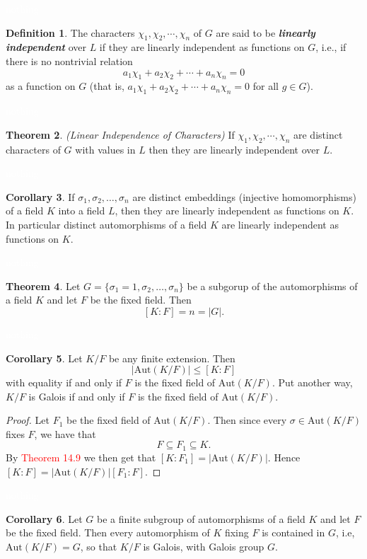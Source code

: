 \documentclass{article}
\theoremstyle{definition}
\newtheorem{thm}{Theorem}[section]
\newtheorem{cor}[thm]{Corollary}
\newtheorem{defn}[thm]{Definition}
\newcommand{\nl}{\textcolor{white}{nothing}}
\newcommand{\seq}{\subseteq}
\newcommand{\sig}{\sigma}
\newcommand{\Aut}{\text{Aut}}
\begin{document}
\nl

\begin{defn}
The characters $\chi_1, \chi_2, \cdots, \chi_n$ of $G$ are said to be \textit{\textbf{linearly independent}} over $L$ if they are linearly independent as functions on $G$, i.e., if there is no nontrivial relation
\[a_1\chi_1 + a_2\chi_2 + \cdots + a_n\chi_n = 0\]
as a function on $G$ (that is, $a_1\chi_1 + a_2\chi_2 + \cdots + a_n\chi_n = 0$ for all $g\in G$).
\end{defn}

\nl

\begin{thm}\textit{(Linear Independence of Characters)}
If $\chi_1, \chi_2, \cdots, \chi_n$ are distinct characters of $G$ with values in $L$ then they are linearly independent over $L$.
\end{thm}

\nl

\begin{cor}
If $\sig_1, \sig_2, \ldots, \sig_n$ are distinct embeddings (injective homomorphisms) of a field $K$ into a field $L$, then they are linearly independent as functions on $K$. In particular distinct automorphisms of a field $K$ are linearly independent as functions on $K$.
\end{cor}

\nl

\begin{thm}
Let $G = \{\sig_1 = 1, \sig_2, \ldots, \sig_n\}$ be a subgorup of the automorphisms of a field $K$ and let $F$ be the fixed field. Then
\[[K:F] = n = |G|.\]
\end{thm}

\nl

\begin{cor}
Let $K/F$ be any finite extension. Then
\[|\Aut(K/F)|\leq [K:F]\]
with equality if and only if $F$ is the fixed field of $\Aut(K/F)$. Put another way, $K/F$ is Galois if and only if $F$ is the fixed field of $\Aut(K/F)$.
\end{cor}

\begin{proof}
Let $F_1$ be the fixed field of $\Aut(K/F)$. Then since every $\sigma \in \Aut(K/F)$ fixes $F$, we have that 
\[F\seq F_1\seq K.\]
By \textcolor{red}{Theorem 14.9} we then get that $[K:F_1] = |\Aut(K/F)|$. Hence $[K:F] = |\Aut(K/F)|[F_1:F]$.
\end{proof}

\nl

\begin{cor}
Let $G$ be a finite subgroup of automorphisms of a field $K$ and let $F$ be the fixed field. Then every automorphism of $K$ fixing $F$ is contained in $G$, i.e, $\Aut(K/F) = G$, so that $K/F$ is Galois, with Galois group $G$.
\end{cor}
\end{document}
